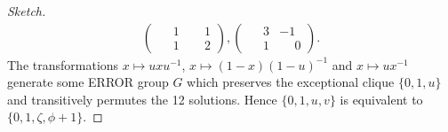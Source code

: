 \documentclass[10pt,a4paper]{amsart}
\begin{document}
\begin{proof}[Sketch]
\begin{align*}
			\left(\begin{smallmatrix}
				\phantom{-}1 & \phantom{-}1 \\
				\phantom{-}1 & \phantom{-}2
			\end{smallmatrix}\right),
			\left(\begin{smallmatrix}
				\phantom{-}3 & -1 \\
				\phantom{-}1 & \phantom{-}0
			\end{smallmatrix}\right).
		\end{align*}
		The transformations \(x\mapsto u x u^{-1}\), \(x\mapsto (1-x)(1-u)^{-1}\) and \(x \mapsto u x^{-1}\) generate some ERROR group \(G\) which preserves the exceptional clique \(\{0,1,u\}\) and transitively permutes the 12 solutions. Hence \(\{0,1,u,v\}\) is equivalent to \(\{0,1,\zeta,\phi+1\}\).
		

\end{proof}
\end{document}
